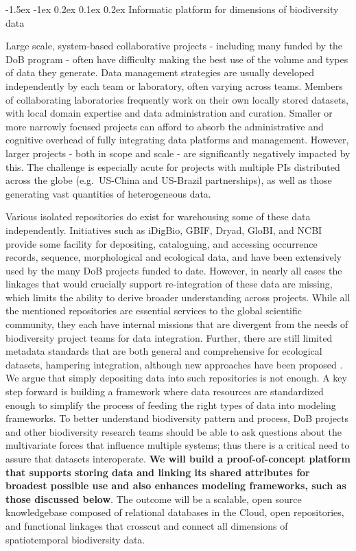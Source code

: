 \documentclass[11pt]{article}
\makeatletter
\renewcommand\subsubsection{\@startsection{subsection}{1}{\z@}%
                                  {-1.5ex \@plus -1ex \@minus 0.2ex}%
                                  {0.1ex \@plus 0.2ex}%
                                  {\normalfont\bfseries}}
\makeatother
\begin{document}
\subsubsection{Informatic platform for dimensions of biodiversity
data}\label{informatic-platform-for-dimensions-of-biodiversity-data}

Large scale, system-based collaborative projects - including many
funded by the DoB program - often have difficulty making the best use
of the volume and types of data they generate. Data management
strategies are usually developed independently by each team or
laboratory, often varying across teams. Members of collaborating
laboratories frequently work on their own locally stored datasets,
with local domain expertise and data administration and
curation. Smaller or more narrowly focused projects can afford to
absorb the administrative and cognitive overhead of fully integrating
data platforms and management. However, larger projects - both in
scope and scale - are significantly negatively impacted by this. The
challenge is especially acute for projects with multiple PIs
distributed across the globe (e.g.~US-China and US-Brazil
partnerships), as well as those generating vast quantities of
heterogeneous data.

Various isolated repositories do exist for warehousing some of these
data independently. Initiatives such as iDigBio, GBIF, Dryad, GloBI,
and NCBI provide some facility for depositing, cataloguing, and
accessing occurrence records, sequence, morphological and ecological
data, and have been extensively used by the many DoB projects funded
to date.  However, in nearly all cases the linkages that would
crucially support re-integration of these data are missing, which
limits the ability to derive broader understanding across
projects. While all the mentioned repositories are essential services
to the global scientific community, they each have internal missions
that are divergent from the needs of biodiversity project teams for
data integration. Further, there are still limited metadata standards
that are both general and comprehensive for ecological datasets,
hampering integration, although new approaches have been proposed
\cite{Guralnick2017-xb}. We argue that simply depositing data into
such repositories is not enough. A key step forward is building a
framework where data resources are standardized enough to simplify the
process of feeding the right types of data into modeling
frameworks. To better understand biodiversity pattern and process, DoB
projects and other biodiversity research teams should be able to ask
questions about the multivariate forces that influence multiple
systems; thus there is a critical need to assure that datasets
interoperate. \textbf{We will build a proof-of-concept platform that
  supports storing data and linking its shared attributes for broadest
  possible use and also enhances modeling frameworks, such as those
  discussed below}. The outcome will be a scalable, open source
knowledgebase composed of relational databases in the Cloud, open
repositories, and functional linkages that crosscut and connect all
dimensions of spatiotemporal biodiversity data.
\end{document}
